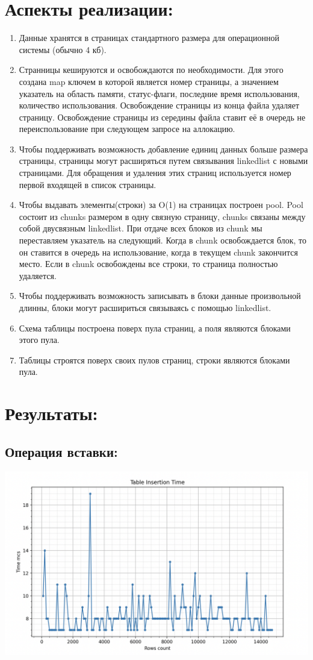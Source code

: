 \documentclass[12pt,onecolumn]{article}
\begin{document}
\section{Аспекты реализации:}
\begin{enumerate}
  \item Данные хранятся в страницах стандартного размера для операционной системы (обычно 4 кб). 
  \item Странницы кешируются и освобождаются по необходимости. Для этого создана map ключем в которой является номер страницы, а значением указатель на область памяти, статус-флаги, последние время использования, количество использования. Освобождение страницы из конца файла удаляет страницу. Освобождение страницы из середины файла ставит её в очередь не переиспользование при следующем запросе на аллокацию.
  \item Чтобы поддерживать возможность добавление единиц данных больше размера страницы, страницы могут расширяться путем связывания linkedlist с новыми страницами. Для обращения и удаления этих страниц используется номер первой входящей в список страницы.
  \item Чтобы выдавать элементы(строки) за O(1) на страницах построен pool. Pool состоит из chunks размером в одну связную страницу, chunks связаны между собой двусвязным linkedlist. При отдаче всех блоков из chunk мы переставляем указатель на следующий. Когда в chunk освобождается блок, то он ставится в очередь на использование, когда в текущем chunk закончится место. Если в chunk освобождены все строки, то страница полностью удаляется.
  \item Чтобы поддерживать возможность записывать в блоки данные произвольной длинны, блоки могут расшириться связываясь с помощью linkedlist.
  \item Схема таблицы построена поверх пула страниц, а поля являются блоками этого пула.
  \item Таблицы строятся поверх своих пулов страниц, строки являются блоками пула.
\end{enumerate}
\section{Результаты:}
\subsection{Операция вставки:}
\includegraphics[width=\textwidth]{image/insert.png}
\end{document}
